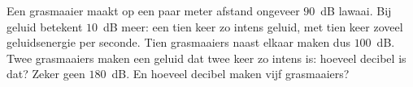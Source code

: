 %


\begin{probleem}
Een grasmaaier maakt op een paar meter afstand ongeveer $90$~dB lawaai. Bij geluid betekent $10$~dB meer: een tien keer zo intens geluid, met tien keer zoveel geluidsenergie per seconde. Tien grasmaaiers naast elkaar maken dus $100$~dB. Twee grasmaaiers maken een geluid dat twee keer zo intens is: hoeveel decibel is dat? Zeker geen $180$~dB. En hoeveel decibel maken vijf grasmaaiers?
\end{probleem}

